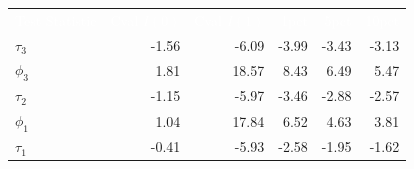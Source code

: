 \documentclass{article}
\begin{document}
    \begin{adjustbox}{width=\textwidth}
        \tiny %
            \begin{tabular}{lrrrrr}
                \rowcolor{mydarkblue}
                \textcolor{white}{Test Statistic}     & \textcolor{white}{Cval $I(0)$}        & \textcolor{white}{Cval $I(1)$}            & \textcolor{white}{1pct}           & \textcolor{white}{5pct}     & \textcolor{white}{10pct}                   \\
                $\tau_3$                              &-1.56                                  &-6.09                                      &-3.99                              &-3.43                        &-3.13                       \\
                $\phi_3$                              & 1.81                                  & 18.57                                     & 8.43                              & 6.49                        & 5.47                       \\
                $\tau_2$                              &-1.15                                  &-5.97                                      &-3.46                              &-2.88                        &-2.57                       \\
                $\phi_1$                              & 1.04                                  & 17.84                                     & 6.52                              & 4.63                        & 3.81                       \\
                $\tau_1$                              &-0.41                                  &-5.93                                      &-2.58                              &-1.95                        &-1.62                       \\
            \end{tabular}
            \hspace*{0.5cm}


\end{adjustbox}
\end{document}
